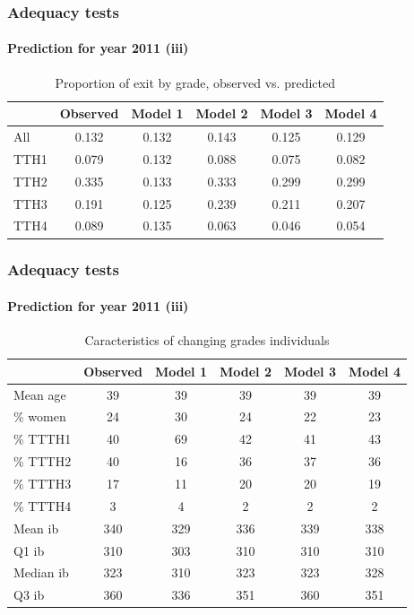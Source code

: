 \documentclass[xcolor=table,ignorenonframetext,12pt]{beamer}
\newenvironment{choixmarges}[2]{\begin{list}{}{%
\setlength{\topsep}{0pt}%
\setlength{\leftmargin}{0pt}%
\setlength{\rightmargin}{0pt}%
\setlength{\listparindent}{\parindent}%
\setlength{\itemindent}{\parindent}%
\setlength{\parsep}{0pt plus 1pt}%
\addtolength{\leftmargin}{#1}%
\addtolength{\rightmargin}{#2}%
}\item }{\end{list}}
\begin{document}
\begin{frame}
\frametitle{Adequacy tests}
\framesubtitle{Prediction for year 2011 (iii)}
\begin{choixmarges}{-0.5cm}{-0.5cm}
\begin{table}[ht]
\caption{Proportion of exit by grade, observed vs. predicted}
\centering
\begingroup\footnotesize
\begin{tabular}{lccccc}
  \hline
 & Observed & Model 1 & Model 2 & Model 3 & Model 4 \\ 
  \hline
All & 0.132 & 0.132 & 0.143 & 0.125 & 0.129 \\ 
  TTH1 & 0.079 & 0.132 & 0.088 & 0.075 & 0.082 \\ 
  TTH2 & 0.335 & 0.133 & 0.333 & 0.299 & 0.299 \\ 
  TTH3 & 0.191 & 0.125 & 0.239 & 0.211 & 0.207 \\ 
  TTH4 & 0.089 & 0.135 & 0.063 & 0.046 & 0.054 \\ 
   \hline
\end{tabular}
\endgroup
\end{table}


\end{choixmarges}

\end{frame}


\begin{frame}
\frametitle{Adequacy tests}
\framesubtitle{Prediction for year 2011 (iii)}


\begin{table}[ht]
\centering
\begingroup\footnotesize
\caption{Caracteristics of changing grades individuals}
\begin{tabular}{lccccc}
\toprule
  & Observed & Model 1 & Model 2 & Model 3 & Model 4 \\ 
\midrule
Mean age & 39 & 39 & 39 & 39 & 39 \\ 
\% women & 24 & 30 & 24 & 22 & 23 \\ 
\midrule
\% TTTH1 & 40 & 69 & 42 & 41 & 43 \\ 
\% TTTH2 & 40 & 16 & 36 & 37 & 36 \\ 
\% TTTH3 & 17 & 11 & 20 & 20 & 19 \\ 
\% TTTH4 & 3 & 4 & 2 & 2 & 2 \\ 
\midrule  
  Mean ib & 340 & 329 & 336 & 339 & 338 \\ 
  Q1 ib & 310 & 303 & 310 & 310 & 310 \\ 
  Median ib & 323 & 310 & 323 & 323 & 328 \\ 
  Q3 ib & 360 & 336 & 351 & 360 & 351 \\ 
\bottomrule  
  \end{tabular}
\endgroup
\end{table}


\end{frame}
\end{document}
